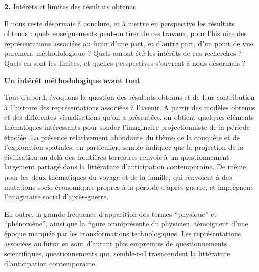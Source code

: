 \documentclass[letterpaper,portrait,12pt]{article}
\begin{document}
\textbf{\textcolor[rgb]{0.000,0.000,0.000}{{\Large 2. }}}\textcolor[rgb]{0.000,0.000,0.000}{{\Large Int\'{e}r\^{e}ts et limites des r\'{e}sultats obtenus}}








\textcolor[rgb]{0.000,0.000,0.000}{	Il nous reste d\'{e}sormais \`{a} conclure, et \`{a} mettre en perspective les r\'{e}sultats obtenus : quels enseignements peut-on tirer de ces travaux, pour l'histoire des repr\'{e}sentations associ\'{e}es au futur d'une part, et d'autre part, d'un point de vue purement m\'{e}thodologique ? Quels auront \'{e}t\'{e} les int\'{e}r\^{e}ts de ces recherches ? Quels en sont les limites, et quelles perspectives s'ouvrent \`{a} nous d\'{e}sormais ?}








\textcolor[rgb]{0.000,0.000,0.000}{{\Large 	}}\textbf{\textcolor[rgb]{0.000,0.000,0.000}{Un int\'{e}r\^{e}t m\'{e}thodologique avant tout}}





\textbf{\textcolor[rgb]{0.000,0.000,0.000}{	}}\textcolor[rgb]{0.000,0.000,0.000}{Tout d'abord, \'{e}voquons la question des r\'{e}sultats obtenus et de leur contribution \`{a} l'histoire des repr\'{e}sentations associ\'{e}es \`{a} l'avenir. A partir des mod\`{e}les obtenus et des diff\'{e}rentes visualisations qu'on a pr\'{e}sent\'{e}es, on obtient quelques \'{e}l\'{e}ments th\'{e}matiques int\'{e}ressants pour sonder l'imaginaire projectionniste de la p\'{e}riode \'{e}tudi\'{e}e. La pr\'{e}sence relativement abondante du th\`{e}me de la conqu\^{e}te et de l'exploration spatiales, en particulier, semble indiquer que la projection de la civilisation au-del\`{a} des fronti\`{e}res terrestres renvoie \`{a} un questionnement largement partag\'{e} dans la litt\'{e}rature d'anticipation contemporaine. De m\^{e}me pour les deux th\'{e}matiques du voyage et de la famille, qui renvoient \`{a} des mutations socio-\'{e}conomiques propres \`{a} la p\'{e}riode d'apr\`{e}s-guerre, et impr\`{e}gnent l'imaginaire social d'apr\`{e}s-guerre.}





\textcolor[rgb]{0.000,0.000,0.000}{	En outre, la grande fr\'{e}quence d'apparition des termes {``}physique'' et {``}ph\'{e}nom\`{e}ne'', ainsi que la figure omnipr\'{e}sente du physicien, t\'{e}moignent d'une \'{e}poque marqu\'{e}e par les transformations technologiques. Les repr\'{e}sentations associ\'{e}es au futur en sont d'autant plus empreintes de questionnements scientifiques, questionnements qui, semble-t-il trasncendent la litt\'{e}rature d'anticipation contemporaine.}
\end{document}
